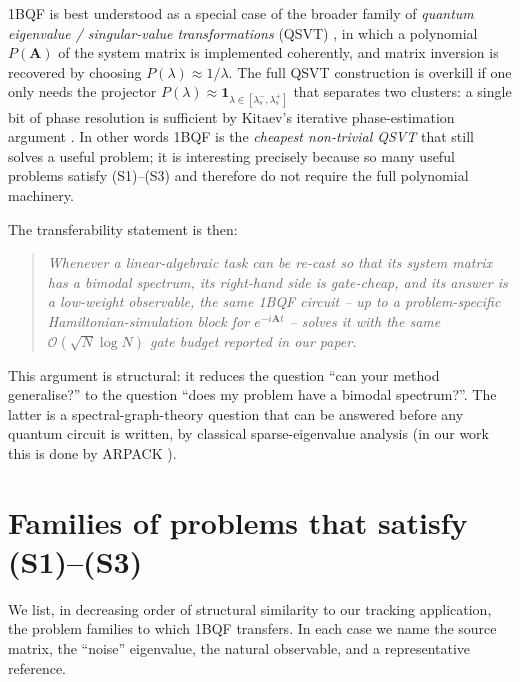 \documentclass[11pt,a4paper]{article}
\newcommand{\OBQF}{\textsc{1BQF}}
\begin{document}
\OBQF{} is best understood as a special case of the broader family of
\emph{quantum eigenvalue / singular-value transformations} (QSVT)
\cite{Gilyen:2019,Martyn:2021}, in which a polynomial $P(\mathbf{A})$ of
the system matrix is implemented coherently, and matrix inversion is
recovered by choosing $P(\lambda) \approx 1/\lambda$.  The full QSVT
construction is overkill if one only needs the projector
$P(\lambda) \approx \mathbf{1}_{\lambda \in [\lambda_s^-,\lambda_s^+]}$
that separates two clusters: a single bit of phase resolution is
sufficient by Kitaev's iterative phase-estimation argument
\cite{Kitaev:1995,Higgins:2007}.  In other words \OBQF{} is the
\emph{cheapest non-trivial QSVT} that still solves a useful problem; it
is interesting precisely because so many useful problems satisfy
(S1)--(S3) and therefore do not require the full polynomial machinery.

The transferability statement is then:
\begin{quote}\itshape
  Whenever a linear-algebraic task can be re-cast so that its system
  matrix has a bimodal spectrum, its right-hand side is gate-cheap, and
  its answer is a low-weight observable, the same \OBQF{} circuit -- up
  to a problem-specific Hamiltonian-simulation block for $e^{-i\mathbf
  A t}$ -- solves it with the same $\mathcal{O}(\sqrt{N}\log N)$ gate
  budget reported in our paper.
\end{quote}
This argument is structural: it reduces the question
``can your method generalise?'' to the
question ``does my problem have a bimodal spectrum?''.  The latter is a
spectral-graph-theory question that can be answered before any quantum
circuit is written, by classical sparse-eigenvalue analysis (in our work
this is done by ARPACK \cite{Lehoucq:1998:arpack}).

\section{Families of problems that satisfy (S1)--(S3)}
\label{sec:families}

We list, in decreasing order of structural similarity to our
tracking application, the problem families to which \OBQF{}
transfers.  In each case we name the source matrix, the
``noise'' eigenvalue, the natural observable, and a representative
reference.
\end{document}
